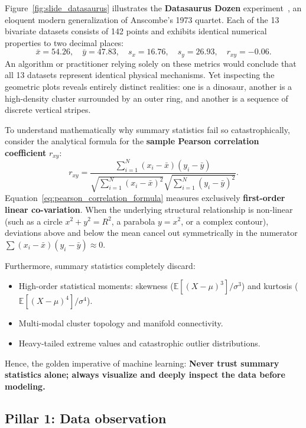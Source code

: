 Figure~\ref{fig:slide_datasaurus} illustrates the \textbf{Datasaurus Dozen} experiment~\cite{matejka2017same}, an eloquent modern generalization of Anscombe's 1973 quartet. Each of the 13 bivariate datasets consists of 142 points and exhibits identical numerical properties to two decimal places:
\begin{equation}
\bar{x} = 54.26, \quad \bar{y} = 47.83, \quad s_x = 16.76, \quad s_y = 26.93, \quad r_{xy} = -0.06.
\label{eq:datasaurus_stats}
\end{equation}
An algorithm or practitioner relying solely on these metrics would conclude that all 13 datasets represent identical physical mechanisms. Yet inspecting the geometric plots reveals entirely distinct realities: one is a dinosaur, another is a high-density cluster surrounded by an outer ring, and another is a sequence of discrete vertical stripes.

To understand mathematically why summary statistics fail so catastrophically, consider the analytical formula for the \textbf{sample Pearson correlation coefficient} $r_{xy}$:
\begin{equation}
r_{xy} = \frac{\sum_{i=1}^N (x_i - \bar{x})(y_i - \bar{y})}{\sqrt{\sum_{i=1}^N (x_i - \bar{x})^2} \sqrt{\sum_{i=1}^N (y_i - \bar{y})^2}}.
\label{eq:pearson_correlation_formula}
\end{equation}
Equation~\eqref{eq:pearson_correlation_formula} measures exclusively \textbf{first-order linear co-variation}. When the underlying structural relationship is non-linear (such as a circle $x^2 + y^2 = R^2$, a parabola $y = x^2$, or a complex contour), deviations above and below the mean cancel out symmetrically in the numerator $\sum (x_i - \bar{x})(y_i - \bar{y}) \approx 0$. 

Furthermore, summary statistics completely discard:
\begin{itemize}[noitemsep]
  \item High-order statistical moments: skewness ($\mathbb{E}[(X-\mu)^3]/\sigma^3$) and kurtosis ($\mathbb{E}[(X-\mu)^4]/\sigma^4$).
  \item Multi-modal cluster topology and manifold connectivity.
  \item Heavy-tailed extreme values and catastrophic outlier distributions.
\end{itemize}
Hence, the golden imperative of machine learning: \textbf{Never trust summary statistics alone; always visualize and deeply inspect the data before modeling.}

\subsection{Pillar 1: Data observation}
\label{sec:pillar_1_observe}

